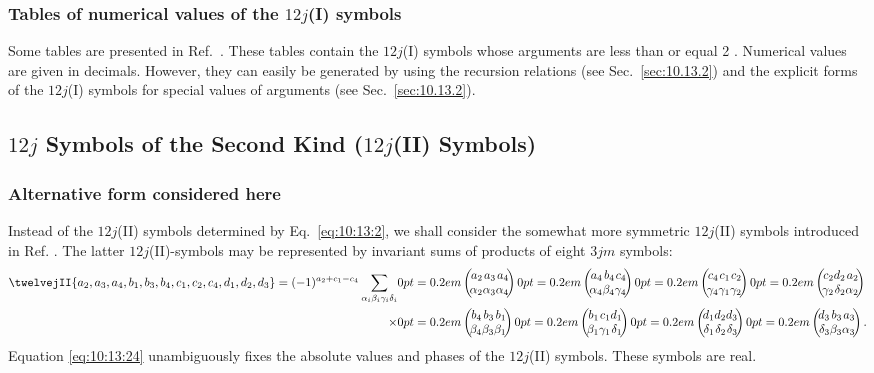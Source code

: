 \subsubsection{Tables of numerical values of the $12j$(I) symbols}
Some tables are presented in Ref.~\cite{ref139}. These tables contain the $12j$(I) symbols whose arguments are less than or equal 2 . Numerical values are given in decimals. However, they can easily be generated by using the recursion relations (see Sec.~\ref{sec:10.13.2}) and the explicit forms of the $12j$(I) symbols for special values of arguments (see Sec.~\ref{sec:10.13.2}).

\subsection{$12j$ Symbols of the Second Kind ($12j$(II) Symbols)}\label{sec:10.13.3}

\subsubsection{Alternative form considered here}
Instead of the $12j$(II) symbols determined by Eq.~\eqref{eq:10:13:2}, we shall consider the somewhat more symmetric $12j$(II) symbols introduced in Ref. \cite{ref141}.
The latter $12j$(II)-symbols may be represented by invariant sums of products of eight $3 j m$ symbols:
\begin{equation}
\begin{aligned}
\twelvejII{a_{2},a_{3},a_{4},b_{1},b_{3},b_{4},c_{1},c_{2},c_{4},d_{1},d_{2},d_{3}}
=(-1)^{a_{2}+c_{1}-c_{4}} \sum_{\alpha_{i} \beta_{i} \gamma_{i} \delta_{i}}
&\threej{a_{2} }{ a_{3} }{ a_{4} }{\alpha_{2} }{ \alpha_{3} }{ \alpha_{4}}\threej{a_{4} }{ b_{4} }{ c_{4} }{\alpha_{4} }{ \beta_{4} }{ \gamma_{4}}\threej{c_{4} }{ c_{1} }{ c_{2} }{\gamma_{4} }{ \gamma_{1} }{ \gamma_{2}}\threej{c_{2} }{ d_{2} }{ a_{2} }{\gamma_{2} }{ \delta_{2} }{ \alpha_{2}} \\
\times&\threej{b_{4} }{ b_{3} }{ b_{1} }{\beta_{4} }{ \beta_{3} }{ \beta_{1}}\threej{b_{1} }{ c_{1} }{ d_{1} }{\beta_{1} }{ \gamma_{1} }{ \delta_{1}}\threej{d_{1} }{ d_{2} }{ d_{3} }{\delta_{1} }{ \delta_{2} }{ \delta_{3}}\threej{d_{3} }{ b_{3} }{ a_{3} }{\delta_{3} }{ \beta_{3} }{ \alpha_{3}} .
\end{aligned}
\label{eq:10:13:24}
\end{equation}
Equation \eqref{eq:10:13:24} unambiguously fixes the absolute values and phases of the $12j$(II) symbols. These symbols are real.\\
